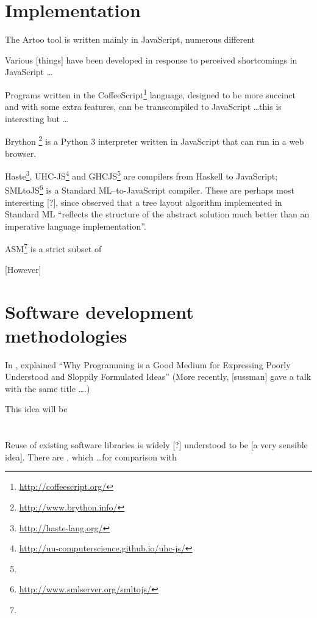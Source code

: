 \section{Implementation}

The Artoo tool is written mainly in JavaScript, numerous different 

Various [things] have been developed in response to perceived shortcomings in JavaScript \ldots

Programs written in the CoffeeScript\footnote{\url{http://coffeescript.org/}} language, designed to be more succinct and with some extra features, can be transcompiled to JavaScript \ldots this is interesting but \ldots

Brython \footnote{\url{http://www.brython.info/}} is a Python 3 interpreter written in JavaScript that can run in a web browser. 

Haste\footnote{\url{http://haste-lang.org/}}, UHC-JS\footnote{\url{http://uu-computerscience.github.io/uhc-js/}} and GHCJS\footnote{} are compilers from Haskell to JavaScript; SMLtoJS\footnote{\url{http://www.smlserver.org/smltojs/}} is a Standard ML--to-JavaScript compiler. These are perhaps most interesting [?], since \citet{kennedyfuntrees} observed that a tree layout algorithm implemented in Standard ML ``reflects the structure of the abstract solution much better than an imperative language implementation''.



ASM\footnote{} is a strict subset of 

[However]


\section{Software development methodologies}

In \citeyear{67poorslop}, \citet*{67poorslop} explained ``Why Programming is a Good Medium for Expressing Poorly Understood and Sloppily Formulated Ideas''
(More recently, [sussman] gave a talk with the same title \ldots {}.)

This idea will be 

\section{}

Reuse of existing software libraries is widely [?] understood to be [a very sensible idea]. There are , which \ldots for comparison with 

